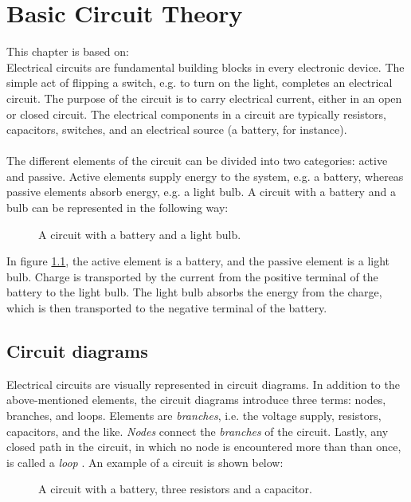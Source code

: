\chapter{Basic Circuit Theory}
This chapter is based on: \cite{bcircuit}\\
Electrical circuits are fundamental building blocks in every electronic device. The simple act of flipping a switch, e.g. to turn on the light, completes an electrical circuit. The purpose of the circuit is to carry electrical current, either in an open or closed circuit. The electrical components in a circuit are typically resistors, capacitors,  switches, and an electrical source (a battery, for instance).
\\ 
\\
The different elements of the circuit can be divided into two categories: active and passive. Active elements supply energy to the system, e.g. a battery, whereas passive elements absorb energy, e.g. a light bulb. A circuit with a battery and a bulb can be represented in the following way:
\begin{figure}[H]

\caption{A circuit with a battery and a light bulb.}
\label{fig:bulb}
\end{figure} 
\noindent In figure \ref{fig:bulb}, the active element is a battery, and the passive element is a light bulb. Charge is transported by the current from the positive terminal of the battery to the light bulb. The light bulb absorbs the energy from the charge, which is then transported to the negative terminal of the battery.
\\



\section{Circuit diagrams}
Electrical circuits are visually represented in circuit diagrams. In addition to the above-mentioned elements, the circuit diagrams introduce three terms: nodes, branches, and loops. Elements are \textit{branches}, i.e.  the voltage supply, resistors, capacitors, and the like. \textit{Nodes} connect the \textit{branches} of the circuit. Lastly, any closed path in the circuit, in which no node is encountered more than than once, is called a \textit{loop} \cite[page~32]{bcircuit}. An example of a circuit is shown below:

\begin{figure}[H] 
\label{bcircuit_figure}
 
 \caption{A circuit with a battery, three resistors and a capacitor.}
\end{figure}

